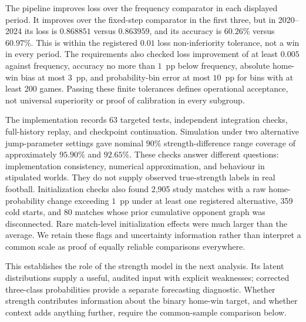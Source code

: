 \begin{table}[htbp]
\centering\small
{}
\label{tab:rating-validation}

\end{table}

The pipeline improves loss over the frequency comparator in each displayed period. It improves over the fixed-step comparator in the first three, but in 2020--2024 its loss is $0.868851$ versus $0.863959$, and its accuracy is $60.26\%$ versus $60.97\%$. This is within the registered $0.01$ loss non-inferiority tolerance, not a win in every period. The requirements also checked loss improvement of at least $0.005$ against frequency, accuracy no more than $1$~pp below frequency, absolute home-win bias at most $3$~pp, and probability-bin error at most $10$~pp for bins with at least 200 games. Passing these finite tolerances defines operational acceptance, not universal superiority or proof of calibration in every subgroup.

The implementation records 63 targeted tests, independent integration checks, full-history replay, and checkpoint continuation. Simulation under two alternative jump-parameter settings gave nominal $90\%$ strength-difference range coverage of approximately $95.90\%$ and $92.65\%$. These checks answer different questions: implementation consistency, numerical approximation, and behaviour in stipulated worlds. They do not supply observed true-strength labels in real football. Initialization checks also found 2,905 study matches with a raw home-probability change exceeding $1$~pp under at least one registered alternative, 359 cold starts, and 80 matches whose prior cumulative opponent graph was disconnected. Rare match-level initialization effects were much larger than the average. We retain these flags and uncertainty information rather than interpret a common scale as proof of equally reliable comparisons everywhere.

This establishes the role of the strength model in the next analysis. Its latent distributions supply a useful, audited input with explicit weaknesses; corrected three-class probabilities provide a separate forecasting diagnostic. Whether strength contributes information about the binary home-win target, and whether context adds anything further, require the common-sample comparison below.
